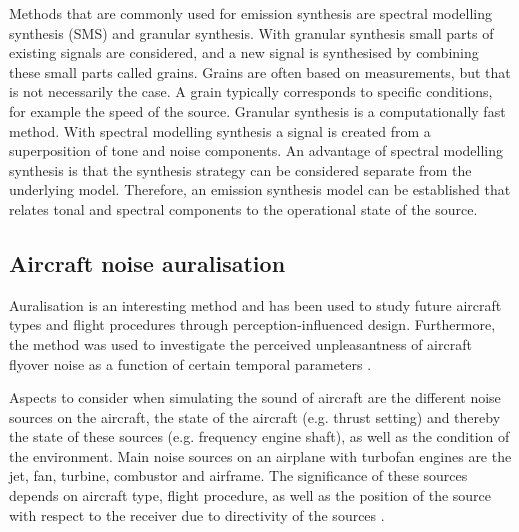 Methods that are commonly used for emission synthesis are spectral modelling
synthesis (SMS) and granular synthesis. With granular synthesis small parts of
existing signals are considered, and a new signal is synthesised by combining
these small parts called grains. Grains are often based on measurements, but
that is not necessarily the case. A grain typically corresponds to specific
conditions, for example the speed of the source. Granular
synthesis is a computationally fast method. With spectral modelling synthesis a
signal is created from a superposition of tone and noise components. An
advantage of spectral modelling synthesis is that the synthesis strategy can be
considered separate from the underlying model. Therefore, an emission synthesis
model can be established that relates tonal and spectral components to the
operational state of the source.

\subsection{Aircraft noise auralisation}
Auralisation is an interesting method and has been used to study future aircraft
types \cite{Rizzi2013,Rizzi2016,Rizzi2016a} and flight procedures
\cite{Sahai2016} through perception-influenced design. Furthermore, the method was used to investigate the perceived
unpleasantness of aircraft flyover noise as a function of certain temporal
parameters \cite{Pate2017}.

Aspects to consider when simulating the sound of aircraft are the different
noise sources on the aircraft, the state of the aircraft (e.g. thrust setting) and thereby the state
of these sources (e.g. frequency engine shaft), as well as the condition of the environment. Main noise
sources on an airplane with turbofan engines are the jet, fan, turbine,
combustor and airframe. The significance of these sources depends on aircraft
type, flight procedure, as well as the position of the source with respect to
the receiver due to directivity of the sources \cite{Bertsch2015}.


